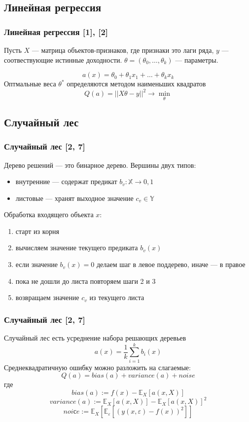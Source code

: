 \documentclass{beamer}
\renewcommand{\epsilon}{\varepsilon}
\begin{document}
\subsection{Линейная регрессия}

\begin{frame}
    \frametitle{Линейная регрессия [1], [2]}
    Пусть $X$ --- матрица объектов-признаков, где признаки это лаги ряда,
    $y$ --- соотвествующие истинные доходности.
    $\theta = (\theta_0, \dots, \theta_k)$ --- параметры.
    
    \[
        a(x) = \theta_0 + \theta_1 x_1 + \dots + \theta_k x_k
    \]
    Оптмальные веса $\theta^*$ определяются методом наименьших квадратов
    \[
        Q(a) = || X\theta - y||^2 \rightarrow \min_{\theta}
    \]
\end{frame}

\subsection{Случайный лес}

\begin{frame}
    \frametitle{Случайный лес [2, 7]}

    Дерево решений --- это бинарное дерево.
    Вершины двух типов:
    \begin{itemize}
        \item внутренние --- содержат предикат $b_v: \mathbb{X} \rightarrow {0, 1}$
        \item листовые --- хранят выходное значение $c_v \in \mathbb{Y}$
    \end{itemize}

    Обработка входящего объекта $x$:
    \begin{enumerate}
        \item старт из корня
        \item вычисляем значение текущего предиката $b_v(x)$
        \item если значение $b_v(x) = 0$ делаем шаг в левое поддерево, иначе --- в правое
        \item пока не дошли до листа повторяем шаги 2 и 3
        \item возвращаем значение $c_v$ из текущего листа
    \end{enumerate}
\end{frame}

\begin{frame}
    \frametitle{Случайный лес [2, 7]}

    Случайный лес есть усреднение набора решающих деревьев
    \[
        a(x) = \frac{1}{k} \sum_{i=1}^{k} b_i(x)
    \]
    Среднеквадратичную ошибку можно разложить на слагаемые:
    \[
        Q(a) = bias(a) + variance(a) + noise
    \]
    где 
    \[
        bias(a) := f(x) - \mathbb{E}_X\left[a(x, X)\right]
    \]
    \[
        variance(a) := \mathbb{E}_X\left[a(x, X)\right] -\mathbb{E}_X\left[a(x, X)\right]^2
    \]
    \[
        noiсe := \mathbb{E}_X\left[\mathbb{E}_{\epsilon}\left[\left( y(x, \epsilon) - f(x) \right)^2\right]\right]
    \]
\end{frame}
\end{document}
